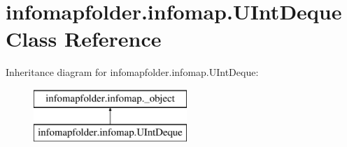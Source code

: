 \hypertarget{classinfomapfolder_1_1infomap_1_1UIntDeque}{}\section{infomapfolder.\+infomap.\+U\+Int\+Deque Class Reference}
\label{classinfomapfolder_1_1infomap_1_1UIntDeque}
Inheritance diagram for infomapfolder.\+infomap.\+U\+Int\+Deque\+:\begin{figure}[H]
\begin{center}
\leavevmode
\includegraphics[height=2.000000cm]{classinfomapfolder_1_1infomap_1_1UIntDeque}
\end{center}
\end{figure}
